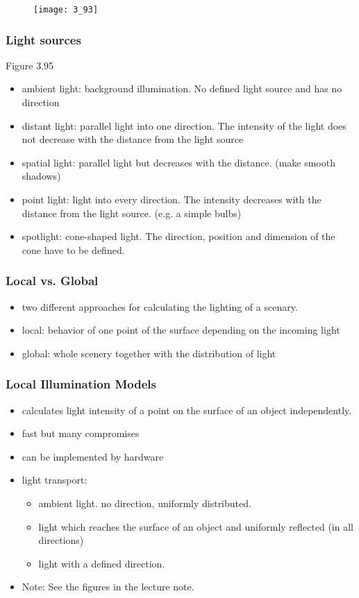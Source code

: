 \documentclass{standalone}
\begin{document}
\begin{figure}[H]
	\texttt{[image: 3\_93]}
\end{figure}

\subsubsection*{Light sources}

Figure 3.95

\begin{itemize}
	\item ambient light: background illumination. No defined light source and has no direction
	\item distant light: parallel light into one direction. The intensity of the light does not decrease with the distance from the light source
	\item spatial light: parallel light but decreases with the distance. (make smooth shadows)
	\item point light: light into every direction. The intensity decreases with the distance from the light source. (e.g. a simple bulbs)
	\item spotlight: cone-shaped light. The direction, position and dimension of the cone have to be defined.
\end{itemize}

\subsubsection*{Local vs. Global}

\begin{itemize}
	\item two different approaches for calculating the lighting of a scenary. 
	\item local: behavior of one point of the surface depending on the incoming light
	\item global: whole scenery together with the distribution of light
\end{itemize}

\subsubsection{Local Illumination Models}

\begin{itemize}
	\item calculates light intensity of a point on the surface of an object independently. 
	\item fast but many compromises
	\item can be implemented by hardware
	\item light transport:
		\begin{itemize}
			\item ambient light. no direction, uniformly distributed. 
			\item light which reaches the surface of an object and uniformly reflected (in all directions)
			\item light with a defined direction. 
		\end{itemize}
	\item Note: See the figures in the lecture note.
\end{itemize}
\end{document}
